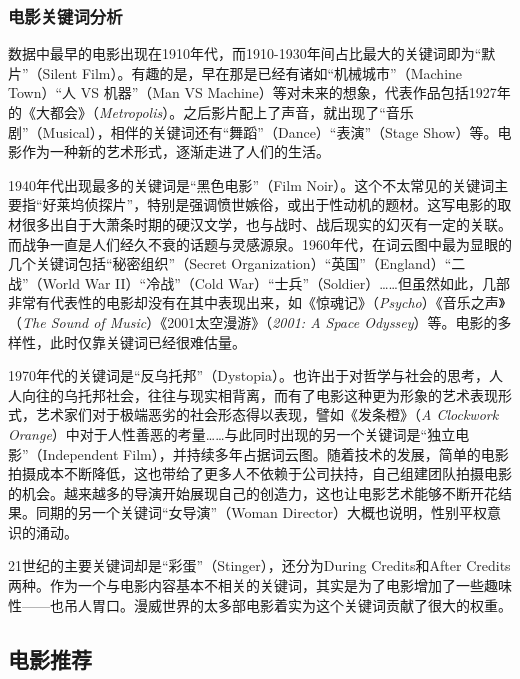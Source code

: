\documentclass[UTF8]{ctexart}
\begin{document}
\subsubsection{电影关键词分析}
\par 数据中最早的电影出现在1910年代，而1910-1930年间占比最大的关键词即为“默片”（Silent Film）。有趣的是，早在那是已经有诸如“机械城市”（Machine Town）“人 VS 机器”（Man VS Machine）等对未来的想象，代表作品包括1927年的《大都会》（\textit{Metropolis}）。之后影片配上了声音，就出现了“音乐剧”（Musical），相伴的关键词还有“舞蹈”（Dance）“表演”（Stage Show）等。电影作为一种新的艺术形式，逐渐走进了人们的生活。
\par 1940年代出现最多的关键词是“黑色电影”（Film Noir）。这个不太常见的关键词主要指“好莱坞侦探片”，特别是强调愤世嫉俗，或出于性动机的题材。这写电影的取材很多出自于大萧条时期的硬汉文学，也与战时、战后现实的幻灭有一定的关联。而战争一直是人们经久不衰的话题与灵感源泉。1960年代，在词云图中最为显眼的几个关键词包括“秘密组织”（Secret Organization）“英国”（England）“二战”（World War II）“冷战”（Cold War）“士兵”（Soldier）……但虽然如此，几部非常有代表性的电影却没有在其中表现出来，如《惊魂记》（\textit{Psycho}）《音乐之声》（\textit{The Sound of Music}）《2001太空漫游》（\textit{2001: A Space Odyssey}）等。电影的多样性，此时仅靠关键词已经很难估量。
\par 1970年代的关键词是“反乌托邦”（Dystopia）。也许出于对哲学与社会的思考，人人向往的乌托邦社会，往往与现实相背离，而有了电影这种更为形象的艺术表现形式，艺术家们对于极端恶劣的社会形态得以表现，譬如《发条橙》（\textit{A Clockwork Orange}）中对于人性善恶的考量……与此同时出现的另一个关键词是“独立电影”（Independent Film），并持续多年占据词云图。随着技术的发展，简单的电影拍摄成本不断降低，这也带给了更多人不依赖于公司扶持，自己组建团队拍摄电影的机会。越来越多的导演开始展现自己的创造力，这也让电影艺术能够不断开花结果。同期的另一个关键词“女导演”（Woman Director）大概也说明，性别平权意识的涌动。
\par 21世纪的主要关键词却是“彩蛋”（Stinger），还分为During Credits和After Credits两种。作为一个与电影内容基本不相关的关键词，其实是为了电影增加了一些趣味性——也吊人胃口。漫威世界的太多部电影着实为这个关键词贡献了很大的权重。

\subsection{电影推荐}
\end{document}
